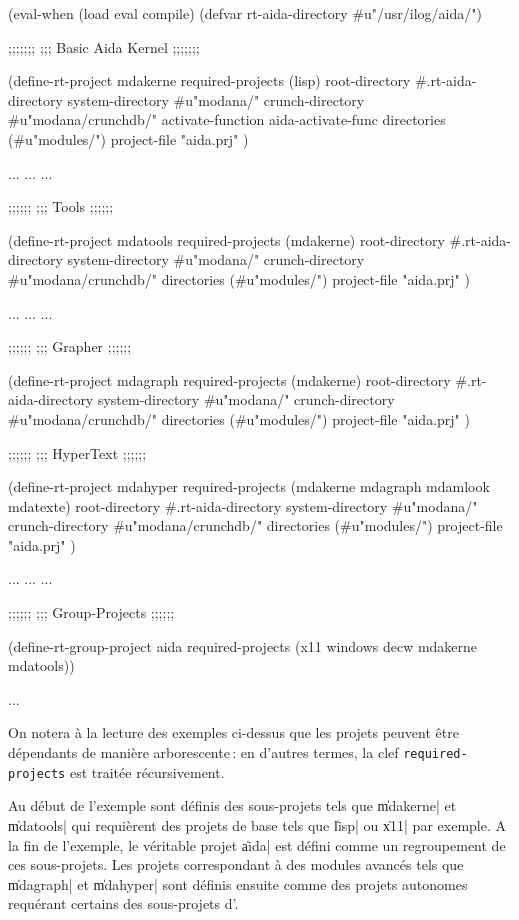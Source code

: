 \begin{Longcode*}
(eval-when (load eval compile)
   (defvar rt-aida-directory #u"/usr/ilog/aida/")

;;;;;;;
;;; Basic Aida Kernel
;;;;;;;

(define-rt-project mdakerne
  required-projects (lisp)
  root-directory #.rt-aida-directory
  system-directory #u"modana/"
  crunch-directory #u"modana/crunchdb/"
  activate-function aida-activate-func
  directories (#u"modules/")
  project-file "aida.prj"
  )

...
...
...

;;;;;;
;;; Tools
;;;;;;

(define-rt-project mdatools
  required-projects (mdakerne)
  root-directory #.rt-aida-directory
  system-directory #u"modana/"
  crunch-directory #u"modana/crunchdb/"
  directories (#u"modules/")
  project-file "aida.prj"
  )

...
...
...

;;;;;;
;;; Grapher
;;;;;;

(define-rt-project mdagraph
  required-projects (mdakerne)
  root-directory #.rt-aida-directory
  system-directory #u"modana/"
  crunch-directory #u"modana/crunchdb/"
  directories (#u"modules/")
  project-file "aida.prj"
  )


;;;;;;
;;; HyperText
;;;;;;

(define-rt-project mdahyper
  required-projects (mdakerne mdagraph mdamlook mdatexte)
  root-directory #.rt-aida-directory
  system-directory #u"modana/"
  crunch-directory #u"modana/crunchdb/"
  directories (#u"modules/")
  project-file "aida.prj"
  )

...
...
...

;;;;;;
;;; Group-Projects
;;;;;;

(define-rt-group-project aida
  required-projects (x11 windows decw mdakerne mdatools))

...
\end{Longcode*}

On notera \`{a} la lecture des exemples ci-dessus que les projets
peuvent \^{e}tre d\'{e}pendants de mani\`{e}re arborescente\,: en d'autres termes, 
la clef {\tt required-projects} est
trait\'{e}e r\'{e}cursivement.

Au d\'{e}but de l'exemple sont d\'{e}finis des sous-projets tels que
\|mdakerne| et \|mdatools| qui requi\`{e}rent des projets de base
tels que \|lisp| ou \|x11| par exemple. 
A la fin de l'exemple, le v\'{e}ritable
projet \|aida| est d\'{e}fini comme un regroupement de ces sous-projets.
Les projets correspondant \`{a} des modules avanc\'{e}s tels que
\|mdagraph| et \|mdahyper| sont d\'{e}finis ensuite comme des
projets autonomes requ\'{e}rant certains des sous-projets d'\Aida.



